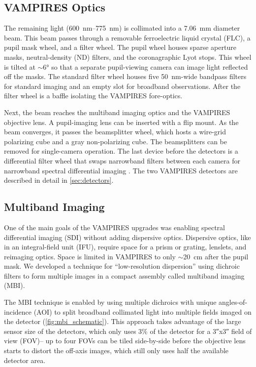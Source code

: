 \subsection{VAMPIRES Optics}

The remaining light (\SIrange{600}{775}{\nano\meter}) is collimated into a \SI{7.06}{\milli\meter} diameter beam. This beam passes through a removable ferroelectric liquid crystal (FLC), a pupil mask wheel, and a filter wheel. The pupil wheel houses sparse aperture masks, neutral-density (ND) filters, and the coronagraphic Lyot stops. This wheel is tilted at $\sim$\ang{6} so that a separate pupil-viewing camera can image light reflected off the masks. The standard filter wheel houses five \SI{50}{\nano\meter}-wide bandpass filters for standard imaging and an empty slot for broadband observations. After the filter wheel is a baffle isolating the VAMPIRES fore-optics.

Next, the beam reaches the multiband imaging optics and the VAMPIRES objective lens. A pupil-imaging lens can be inserted with a flip mount. As the beam converges, it passes the beamsplitter wheel, which hosts a wire-grid polarizing cube and a gray non-polarizing cube. The beamsplitters can be removed for single-camera operation. The last device before the detectors is a differential filter wheel that swaps narrowband filters between each camera for narrowband spectral differential imaging \citep{uyama_high-contrast_2020}. The two VAMPIRES detectors are described in detail in \autoref{sec:detectors}.

\subsection{Multiband Imaging} \label{sec:mbi}

One of the main goals of the VAMPIRES upgrades was enabling spectral differential imaging (SDI) without adding dispersive optics. Dispersive optics, like in an integral-field unit (IFU), require space for a prism or grating, lenslets, and reimaging optics. Space is limited in VAMPIRES to only $\sim$\SI{20}{\centi\meter} after the pupil mask. We developed a technique for ``low-resolution dispersion'' using dichroic filters to form multiple images in a compact assembly called multiband imaging (MBI).

The MBI technique is enabled by using multiple dichroics with unique angles-of-incidence (AOI) to split broadband collimated light into multiple fields imaged on the detector (\autoref{fig:mbi_schematic}). This approach takes advantage of the large sensor size of the detectors, which only uses 3\% of the detector for a \ang{;;3}x\ang{;;3} field of view (FOV)-- up to four FOVs can be tiled side-by-side before the objective lens starts to distort the off-axis images, which still only uses half the available detector area.

